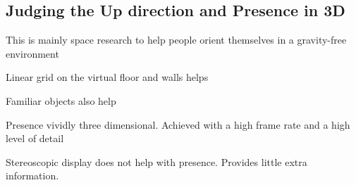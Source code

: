 \begin{mdframed}
\subsection{Judging the Up direction and Presence in 3D}
\begin{multicols}{2}
\begin{compactdesc}
\item[This is mainly space research] to help people orient themselves in
    a gravity-free environment
\item[Linear grid] on the virtual floor and walls helps
\item[Familiar objects] also help
\item[Presence] vividly three dimensional. Achieved with a high frame rate and
    a high level of detail
\item[Stereoscopic display] does not help with presence.
    Provides little extra information.
\end{compactdesc}
\end{multicols}\end{mdframed}


